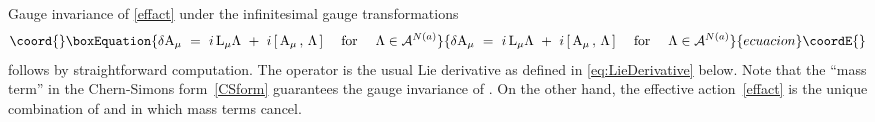 \documentclass[12pt,a4paper]{article}
\providecommand{\mc}{\mathcal} %
\def\cS{{\mathcal S}}
\def\tA{{\rm A}}
\def\tL{{\rm L}}
\begin{document}
Gauge invariance of \eqref{effact} under  the infinitesimal 
gauge transformations
\begin{equation}\coord{}\boxEquation{
\label{eq:GaugeTrafos}
 \delta\tA_\mu  \ = \ i\,\tL_\mu \Lambda \ +\  i\, [\, \tA_\mu\, ,\, 
    \Lambda\, ]  \ \ \ \text{ for } \ \ \ \Lambda \in 
    \mc{A}^{N(a)} 
}{
\delta\tA_\mu  \ = \ i\,\tL_\mu \Lambda \ +\  i\, [\, \tA_\mu\, ,\, 
    \Lambda\, ]  \ \ \ \text{ for } \ \ \ \Lambda \in 
    \mc{A}^{N(a)} 
}{ecuacion}\coordE{}\end{equation}
follows by straightforward computation. The operator \myHighlight{$\tL$}\coordHE{} is the 
usual Lie derivative as defined in \eqref{eq:LieDerivative} below.
Note that the ``mass term'' 
in the Chern-Simons form~\eqref{CSform} guarantees the gauge 
invariance of \myHighlight{$\cS_{{\rm CS}}$}\coordHE{}. On the other hand, the effective 
action~\eqref{effact} is the unique combination of \myHighlight{$\cS_{\rm YM}$}\coordHE{} 
and \myHighlight{$\cS_{\rm CS}$}\coordHE{} in which mass terms cancel. 
\smallskip
\end{document}
